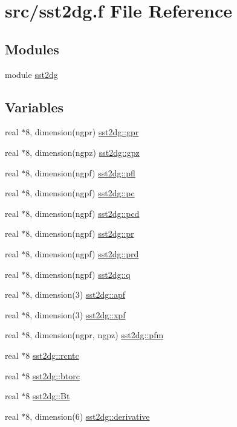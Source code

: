 \hypertarget{sst2dg_8f}{
\section{src/sst2dg.f File Reference}
\label{sst2dg_8f}
}
\subsection*{Modules}
\begin{CompactItemize}
\item 
module \hyperlink{namespacesst2dg}{sst2dg}
\end{CompactItemize}
\subsection*{Variables}
\begin{CompactItemize}
\item 
real $\ast$8, dimension(ngpr) \hyperlink{namespacesst2dg_f791e86241018c9bb33cec0443b40af8}{sst2dg::gpr}
\item 
real $\ast$8, dimension(ngpz) \hyperlink{namespacesst2dg_82caba92133c4a04b34288af472f7062}{sst2dg::gpz}
\item 
real $\ast$8, dimension(ngpf) \hyperlink{namespacesst2dg_2203dfee9c8d2e237448b1db690841e8}{sst2dg::pfl}
\item 
real $\ast$8, dimension(ngpf) \hyperlink{namespacesst2dg_9f23908c8ac0e5d6fbb4ad52dc264f34}{sst2dg::pc}
\item 
real $\ast$8, dimension(ngpf) \hyperlink{namespacesst2dg_3faab1369647d235c6af4263bbb20b5f}{sst2dg::pcd}
\item 
real $\ast$8, dimension(ngpf) \hyperlink{namespacesst2dg_21c838c895717871a1ecda9aca97e18c}{sst2dg::pr}
\item 
real $\ast$8, dimension(ngpf) \hyperlink{namespacesst2dg_4dcd19f888989c1c8a8b00ae96550144}{sst2dg::prd}
\item 
real $\ast$8, dimension(ngpf) \hyperlink{namespacesst2dg_b6dac7ae161bf3684a33bfc278f4a627}{sst2dg::q}
\item 
real $\ast$8, dimension(3) \hyperlink{namespacesst2dg_3acca40cb9b97fe216f3f11dd3c7b4da}{sst2dg::apf}
\item 
real $\ast$8, dimension(3) \hyperlink{namespacesst2dg_29432778288d94db8d33519f10679b1f}{sst2dg::xpf}
\item 
real $\ast$8, dimension(ngpr, ngpz) \hyperlink{namespacesst2dg_15842cce2147922d148223aebbdd979b}{sst2dg::pfm}
\item 
real $\ast$8 \hyperlink{namespacesst2dg_87457152e8dd71203a0bfb7a6ee0ce7a}{sst2dg::rcntc}
\item 
real $\ast$8 \hyperlink{namespacesst2dg_9aff60cf58711338aef804123dca3cd5}{sst2dg::btorc}
\item 
real $\ast$8 \hyperlink{namespacesst2dg_8213ddbfdc0dce0dd4119c3c22c626ac}{sst2dg::Bt}
\item 
real $\ast$8, dimension(6) \hyperlink{namespacesst2dg_3ba2dea221af554e256dce59b5dbb988}{sst2dg::derivative}
\end{CompactItemize}
